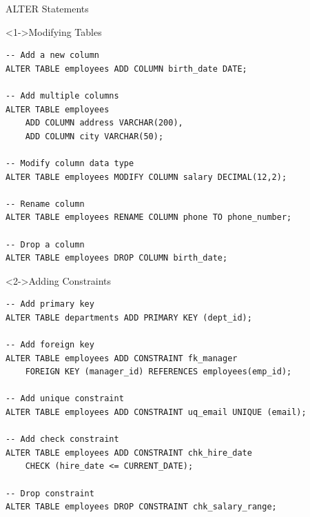 \documentclass[aspectratio=169,11pt]{beamer}
\begin{document}
\begin{frame}[fragile]{ALTER Statements}
\begin{exampleblock}<1->{Modifying Tables}
\begin{lstlisting}
-- Add a new column
ALTER TABLE employees ADD COLUMN birth_date DATE;

-- Add multiple columns
ALTER TABLE employees 
    ADD COLUMN address VARCHAR(200),
    ADD COLUMN city VARCHAR(50);

-- Modify column data type
ALTER TABLE employees MODIFY COLUMN salary DECIMAL(12,2);

-- Rename column
ALTER TABLE employees RENAME COLUMN phone TO phone_number;

-- Drop a column
ALTER TABLE employees DROP COLUMN birth_date;
\end{lstlisting}
\end{exampleblock}

\pause
\begin{exampleblock}<2->{Adding Constraints}
\begin{lstlisting}
-- Add primary key
ALTER TABLE departments ADD PRIMARY KEY (dept_id);

-- Add foreign key
ALTER TABLE employees ADD CONSTRAINT fk_manager 
    FOREIGN KEY (manager_id) REFERENCES employees(emp_id);

-- Add unique constraint
ALTER TABLE employees ADD CONSTRAINT uq_email UNIQUE (email);

-- Add check constraint
ALTER TABLE employees ADD CONSTRAINT chk_hire_date 
    CHECK (hire_date <= CURRENT_DATE);

-- Drop constraint
ALTER TABLE employees DROP CONSTRAINT chk_salary_range;
\end{lstlisting}
\end{exampleblock}
\end{frame}
\end{document}
